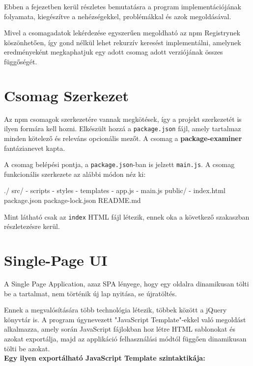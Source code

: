 
Ebben a fejezetben kerül részletes bemutatásra a program implementációjának folyamata, kiegészítve a nehézségekkel, problémákkal és azok megoldásával. 

Mivel a csomagadatok lekérdezése egyszerűen megoldható az npm Registrynek köszönhetően, így gond nélkül lehet rekurzív keresést implementálni, amelynek eredményeként megkaphatjuk egy adott csomag adott verziójának összes függőségét.

\section{Csomag Szerkezet}
Az npm csomagok szerkezetére vannak megkötések, így a projekt szerkezetét is ilyen formára kell hozni. Elkészült hozzá a \texttt{package.json} fájl, amely tartalmaz minden kötelező és releváns opcionális mezőt. A csomag a \textbf{package-examiner} fantázianevet kapta.   

A csomag belépési pontja, a \texttt{package.json}-ban is jelzett \texttt{main.js}. A csomag funkcionális szerkezete az alábbi módon néz ki:

\begin{cpp}
./	
	src/
		- scripts
		- styles
		- templates
		- app.js
		- main.js
	public/
		- index.html
	package.json
	package-lock.json
	README.md	
\end{cpp}

Mint látható csak az \texttt{index} HTML fájl létezik, ennek oka a következő szakaszban részletezésre kerül.

\pagebreak

\section{Single-Page UI}

A Single Page Application, azaz SPA lényege, hogy egy oldalra dinamikusan tölti be a tartalmat, nem történik új lap nyitása, se újratöltés.

Ennek a megvalósítására több technológia létezik, többek között a jQuery könyvtár is. A program úgynevezett "JavaScript Template"-ekkel való megoldást alkalmazza, amely során JavaScript fájlokban hoz létre HTML sablonokat és azokat exportálja, majd az applikáció felhasználási módtól függően dinamikusan tölti be azokat.\\

\textbf{Egy ilyen exportálható JavaScript Template szintaktikája:}

